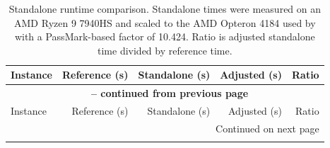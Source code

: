 \documentclass[11pt]{article}
\begin{document}
\begingroup
\small
\begin{longtable}{lrrrr}
\caption{Standalone runtime comparison. Standalone times were measured on an
AMD Ryzen 9 7940HS and scaled to the AMD Opteron 4184 used by
\textcite{LeiHao2024} with a PassMark-based factor of 10.424. Ratio is adjusted
standalone time divided by reference time.} \label{tab:runtime_adjusted} \\
\hline
Instance & Reference (s) & Standalone (s) & Adjusted (s) & Ratio \\
\hline
\endfirsthead

\multicolumn{5}{c}{{\bfseries \tablename\ \thetable{} -- continued from previous page}} \\
\hline
Instance & Reference (s) & Standalone (s) & Adjusted (s) & Ratio \\
\hline
\endhead

\hline \multicolumn{5}{r}{{Continued on next page}} \\
\endfoot

\hline
\endlastfoot


\end{longtable}
\end{document}
